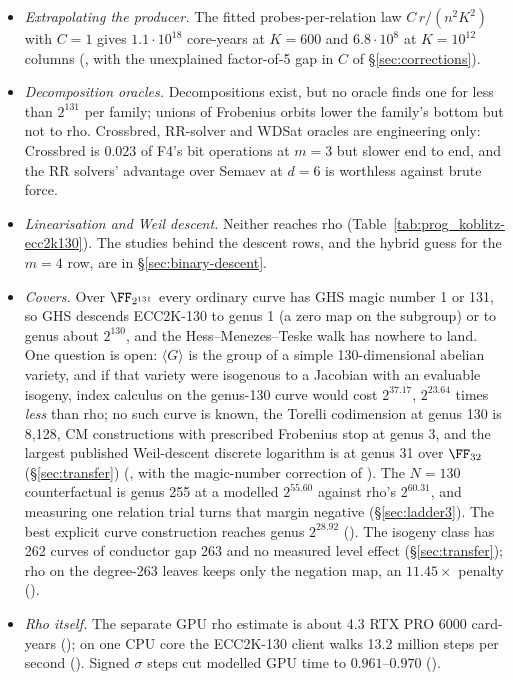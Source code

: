 \begin{itemize}
\item \emph{Extrapolating the producer.} The fitted probes-per-relation law
  $C\,r/(n^2K^2)$ with $C=1$ gives $1.1\cdot10^{18}$ core-years at $K=600$
  and $6.8\cdot10^{8}$ at $K=10^{12}$ columns
  (, with the unexplained
  factor-of-5 gap in $C$ of \S\ref{sec:corrections}).
\item \emph{Decomposition oracles.} Decompositions exist, but no oracle
  finds one for less than $2^{131}$ per family; unions of Frobenius orbits
  lower the family's bottom but not to rho. Crossbred, RR-solver and WDSat
  oracles are engineering only: Crossbred is $0.023$ of F4's bit operations
  at $m=3$ but slower end to end, and the RR solvers' advantage over Semaev
  at $d=6$ is worthless against brute force.
\item \emph{Linearisation and Weil descent.} Neither reaches rho
  (Table~\ref{tab:prog_koblitz-ecc2k130}). The studies behind the descent
  rows, and the hybrid guess for the $m=4$ row, are in
  \S\ref{sec:binary-descent}.
\item \emph{Covers.} Over $\FF_{2^{131}}$ every ordinary curve has GHS
  magic number 1 or 131, so GHS descends ECC2K-130 to genus 1 (a zero map on
  the subgroup) or to genus about $2^{130}$, and the Hess--Menezes--Teske walk
  has nowhere to land. One question is open: $\langle G\rangle$ is the group
  of a simple 130-dimensional abelian variety, and if that variety were
  isogenous to a Jacobian with an evaluable isogeny, index calculus on the
  genus-130 curve would cost $2^{37.17}$, $2^{23.64}$ times \emph{less} than
  rho; no such curve is known, the Torelli codimension at genus 130 is
  8{,}128, CM constructions with prescribed Frobenius stop at genus 3, and the
  largest published Weil-descent discrete logarithm is at genus 31 over
  $\FF_{32}$ (\S\ref{sec:transfer})
  (, with the
  magic-number correction of
  ). The
  $N=130$ counterfactual is genus 255 at a modelled $2^{55.60}$ against rho's
  $2^{60.31}$, and measuring one relation trial turns that margin negative
  (\S\ref{sec:ladder3}). The best explicit curve construction reaches genus
  $2^{28.92}$
  ().
  The isogeny class has 262 curves of conductor gap 263 and no measured
  level effect (\S\ref{sec:transfer}); rho on the degree-263 leaves keeps
  only the negation map, an $11.45\times$ penalty
  ().
\item \emph{Rho itself.} The separate GPU rho estimate is about 4.3 RTX PRO
  6000 card-years (); on one CPU core the ECC2K-130
  client walks 13.2 million steps per second
  (). Signed $\sigma$ steps
  cut modelled GPU time to $0.961$--$0.970$
  ().
\end{itemize}
